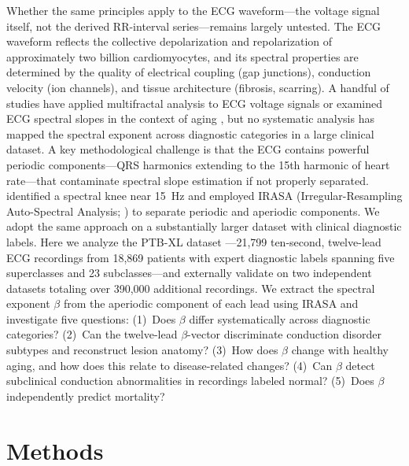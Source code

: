 \documentclass[11pt,a4paper]{article}
\begin{document}
Whether the same principles apply to the ECG waveform---the voltage signal itself, not the derived RR-interval series---remains largely untested. The ECG waveform reflects the collective depolarization and repolarization of approximately two billion cardiomyocytes, and its spectral properties are determined by the quality of electrical coupling (gap junctions), conduction velocity (ion channels), and tissue architecture (fibrosis, scarring). A handful of studies have applied multifractal analysis to ECG voltage signals \citep{Yang2020, Shekatkar2017} or examined ECG spectral slopes in the context of aging \citep{Schmidt2025}, but no systematic analysis has mapped the spectral exponent across diagnostic categories in a large clinical dataset.
A key methodological challenge is that the ECG contains powerful periodic components---QRS harmonics extending to the 15th harmonic of heart rate---that contaminate spectral slope estimation if not properly separated. \citet{Schmidt2025} identified a spectral knee near 15~Hz and employed IRASA (Irregular-Resampling Auto-Spectral Analysis; \citealt{Wen2016}) to separate periodic and aperiodic components. We adopt the same approach on a substantially larger dataset with clinical diagnostic labels.
Here we analyze the PTB-XL dataset \citep{Wagner2020}---21,799 ten-second, twelve-lead ECG recordings from 18,869 patients with expert diagnostic labels spanning five superclasses and 23 subclasses---and externally validate on two independent datasets totaling over 390,000 additional recordings. We extract the spectral exponent $\beta$ from the aperiodic component of each lead using IRASA and investigate five questions: (1)~Does $\beta$ differ systematically across diagnostic categories? (2)~Can the twelve-lead $\beta$-vector discriminate conduction disorder subtypes and reconstruct lesion anatomy? (3)~How does $\beta$ change with healthy aging, and how does this relate to disease-related changes? (4)~Can $\beta$ detect subclinical conduction abnormalities in recordings labeled normal? (5)~Does $\beta$ independently predict mortality?
\section{Methods}
\end{document}
